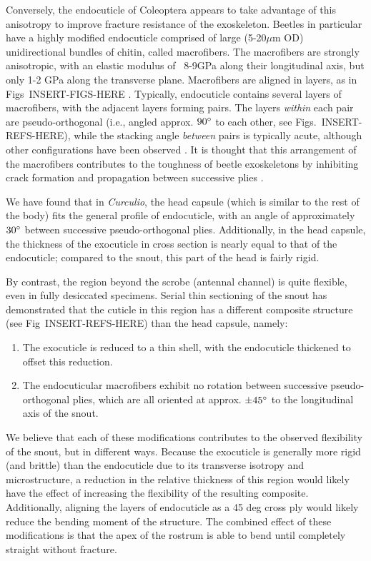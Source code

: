 \documentclass[twocolumn, linenumbers, superscriptaddress]{revtex4-1}
\begin{document}
		Conversely, the endocuticle of Coleoptera appears to take advantage of this anisotropy to improve fracture resistance of the exoskeleton.
		Beetles in particular have a highly modified endocuticle comprised of large (5-20$\mu$m OD) unidirectional bundles of chitin, called macrofibers.
		The macrofibers are strongly anisotropic, with an elastic modulus of ~8-9GPa along their longitudinal axis, but only 1-2 GPa along the transverse plane.
		Macrofibers are aligned in layers, as in Figs~INSERT-FIGS-HERE \cite{Kamp2010,Kamp2015}.
		Typically, endocuticle contains several layers of macrofibers, with the adjacent layers forming pairs. 
		The layers \emph{within} each pair are pseudo-orthogonal (i.e., angled approx. $90\degree$ to each other, see Figs.~INSERT-REFS-HERE), while the stacking angle \emph{between} pairs is typically acute, although other configurations have been observed \cite{Hepburn1973,Kamp2010}.
		It is thought that this arrangement of the macrofibers contributes to the toughness of beetle exoskeletons by inhibiting crack formation and propagation between successive plies \cite{Kamp2010,Kamp2015,Hepburn1973}.		
		
		We have found that in \textit{Curculio}, the head capsule (which is similar to the rest of the body) fits the general profile of endocuticle, with an angle of approximately $30\degree$ between successive pseudo-orthogonal plies.
		Additionally, in the head capsule, the thickness of the exocuticle in cross section is nearly equal to that of the endocuticle; compared to the snout, this part of the head is fairly rigid.
		
		By contrast, the region beyond the scrobe (antennal channel) is quite flexible, even in fully desiccated specimens.
		Serial thin sectioning of the snout has demonstrated that the cuticle in this region has a different composite structure (see Fig~INSERT-REFS-HERE) than the head capsule, namely:

		\begin{enumerate}
			\item The exocuticle is reduced to a thin shell, with the endocuticle thickened to offset this reduction.
			\item The endocuticular macrofibers exhibit no rotation between successive pseudo-orthogonal plies, which are all oriented at approx. $\pm45\degree$ to the longitudinal axis of the snout.
		\end{enumerate}
		
		We believe that each of these modifications contributes to the observed flexibility of the snout, but in different ways.
		Because the exocuticle is generally more rigid (and brittle) than the endocuticle due to its transverse isotropy and microstructure, a reduction in the relative thickness of this region would likely have the effect of increasing the flexibility of the resulting composite.
		Additionally, aligning the layers of endocuticle as a 45 deg cross ply would likely reduce the bending moment of the structure.
		The combined effect of these modifications is that the apex of the rostrum is able to bend until completely straight without fracture.
		
\end{document}
